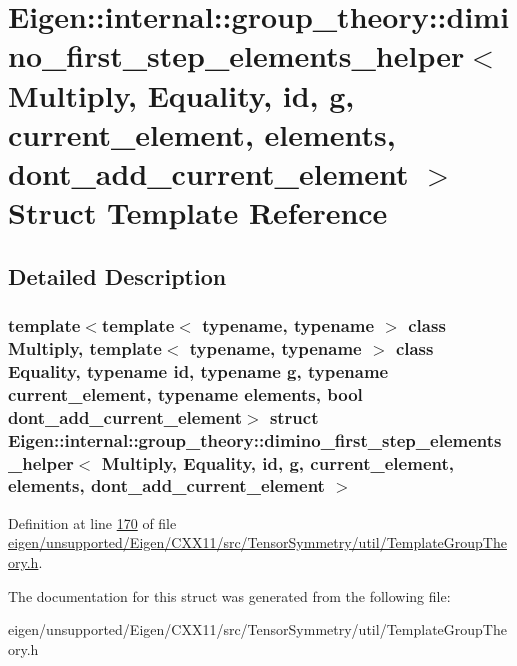 \hypertarget{struct_eigen_1_1internal_1_1group__theory_1_1dimino__first__step__elements__helper}{}\section{Eigen\+:\+:internal\+:\+:group\+\_\+theory\+:\+:dimino\+\_\+first\+\_\+step\+\_\+elements\+\_\+helper$<$ Multiply, Equality, id, g, current\+\_\+element, elements, dont\+\_\+add\+\_\+current\+\_\+element $>$ Struct Template Reference}
\label{struct_eigen_1_1internal_1_1group__theory_1_1dimino__first__step__elements__helper}


\subsection{Detailed Description}
\subsubsection*{template$<$template$<$ typename, typename $>$ class Multiply, template$<$ typename, typename $>$ class Equality, typename id, typename g, typename current\+\_\+element, typename elements, bool dont\+\_\+add\+\_\+current\+\_\+element$>$\newline
struct Eigen\+::internal\+::group\+\_\+theory\+::dimino\+\_\+first\+\_\+step\+\_\+elements\+\_\+helper$<$ Multiply, Equality, id, g, current\+\_\+element, elements, dont\+\_\+add\+\_\+current\+\_\+element $>$}



Definition at line \hyperlink{eigen_2unsupported_2_eigen_2_c_x_x11_2src_2_tensor_symmetry_2util_2_template_group_theory_8h_source_l00170}{170} of file \hyperlink{eigen_2unsupported_2_eigen_2_c_x_x11_2src_2_tensor_symmetry_2util_2_template_group_theory_8h_source}{eigen/unsupported/\+Eigen/\+C\+X\+X11/src/\+Tensor\+Symmetry/util/\+Template\+Group\+Theory.\+h}.



The documentation for this struct was generated from the following file\+:\begin{DoxyCompactItemize}
\item 
eigen/unsupported/\+Eigen/\+C\+X\+X11/src/\+Tensor\+Symmetry/util/\+Template\+Group\+Theory.\+h\end{DoxyCompactItemize}
